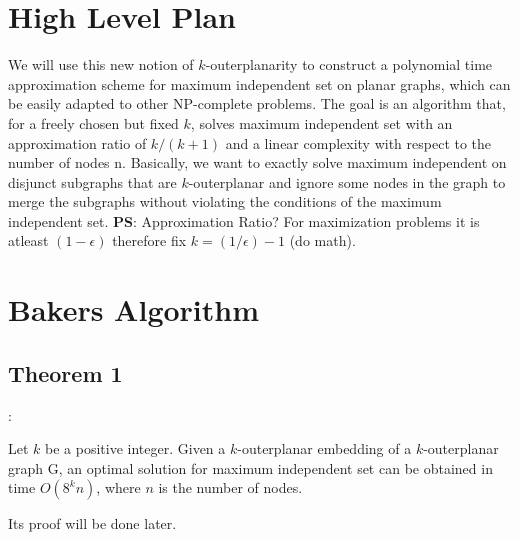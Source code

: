 \documentclass{beamer}
\begin{document}
\section{High Level Plan}
\begin{frame}{\secname}
    We will use this new notion of $k$-outerplanarity to construct a polynomial time approximation scheme for maximum independent set on planar graphs, which can be
easily adapted to other NP-complete problems. The goal
is an algorithm that, for a freely chosen but fixed $k$, solves maximum independent set with an approximation ratio
of $k / (k + 1)$ and a linear complexity with respect to the
number of nodes n.
Basically, we want to exactly solve maximum independent on disjunct subgraphs that are $k$-outerplanar and
ignore some nodes in the graph to merge the subgraphs
without violating the conditions of the maximum independent set.
\newline
\newline
\newline
\textbf{PS}: Approximation Ratio? For maximization problems it is atleast $(1 - \epsilon)$ therefore fix $k = (1/\epsilon) - 1$ (do math).
\end{frame}
\section{Bakers Algorithm}
\subsection{Theorem 1}
\begin{frame}{\secname : \subsecname}
   \begin{theorem} 
    [Baker, 1994] Let $k$ be a positive integer. Given a $k$-outerplanar embedding of a $k$-outerplanar
    graph G, an optimal solution for maximum independent
    set can be obtained in time $O(8^kn)$, where $n$ is the number of nodes.
    \end{theorem}

    Its proof will be done later.
\end{frame}
\end{document}
